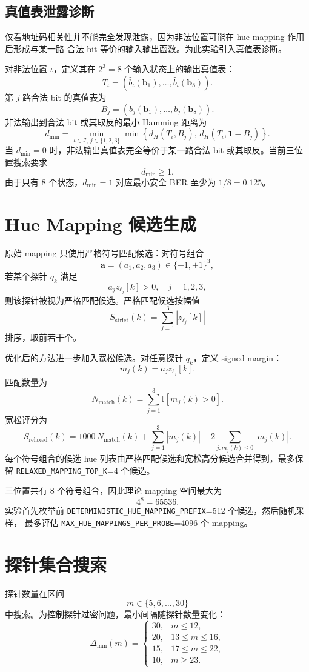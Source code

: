 \documentclass[UTF8,a4paper,11pt]{ctexart}
\begin{document}
\subsection{真值表泄露诊断}

仅看地址码相关性并不能完全发现泄露，因为非法位置可能在 hue mapping 作用后形成与某一路
合法 bit 等价的输入输出函数。为此实验引入真值表诊断。

对非法位置 $\iota$，定义其在 $2^3=8$ 个输入状态上的输出真值表：
\[
T_{\iota}=
\left(
\hat{b}_{\iota}(\mathbf{b}_1),\ldots,
\hat{b}_{\iota}(\mathbf{b}_8)
\right).
\]
第 $j$ 路合法 bit 的真值表为
\[
B_j=
\left(
b_j(\mathbf{b}_1),\ldots,b_j(\mathbf{b}_8)
\right).
\]
非法输出到合法 bit 或其取反的最小 Hamming 距离为
\[
d_{\min}
=
\min_{\iota\in\mathcal{I},\,j\in\{1,2,3\}}
\min\left\{
d_H(T_{\iota},B_j),\,
d_H(T_{\iota},\mathbf{1}-B_j)
\right\}.
\]
当 $d_{\min}=0$ 时，非法输出真值表完全等价于某一路合法 bit 或其取反。当前三位置搜索要求
\[
d_{\min}\geq 1.
\]
由于只有 8 个状态，$d_{\min}=1$ 对应最小安全 BER 至少为 $1/8=0.125$。

\section{Hue Mapping 候选生成}

原始 mapping 只使用严格符号匹配候选：对符号组合
\[
\mathbf{a}=(a_1,a_2,a_3)\in\{-1,+1\}^3,
\]
若某个探针 $q_k$ 满足
\[
a_j z_{\ell_j}[k] > 0,\quad j=1,2,3,
\]
则该探针被视为严格匹配候选。严格匹配候选按幅值
\[
S_{\mathrm{strict}}(k)=\sum_{j=1}^{3}|z_{\ell_j}[k]|
\]
排序，取前若干个。

优化后的方法进一步加入宽松候选。对任意探针 $q_k$，定义 signed margin：
\[
m_j(k)=a_j z_{\ell_j}[k].
\]
匹配数量为
\[
N_{\mathrm{match}}(k)=\sum_{j=1}^{3}\mathbb{I}[m_j(k)>0].
\]
宽松评分为
\[
S_{\mathrm{relaxed}}(k)
=1000\,N_{\mathrm{match}}(k)
+\sum_{j=1}^{3}|m_j(k)|
-2\sum_{j:m_j(k)\leq 0}|m_j(k)|.
\]
每个符号组合的候选 hue 列表由严格匹配候选和宽松高分候选合并得到，最多保留
\texttt{RELAXED\_MAPPING\_TOP\_K}=4 个候选。

三位置共有 8 个符号组合，因此理论 mapping 空间最大为
\[
4^8=65536.
\]
实验首先枚举前 \texttt{DETERMINISTIC\_HUE\_MAPPING\_PREFIX}=512 个候选，然后随机采样，
最多评估 \texttt{MAX\_HUE\_MAPPINGS\_PER\_PROBE}=4096 个 mapping。

\section{探针集合搜索}

探针数量在区间
\[
m\in\{5,6,\ldots,30\}
\]
中搜索。为控制探针过密问题，最小间隔随探针数量变化：
\[
\Delta_{\min}(m)=
\begin{cases}
30, & m\leq 12,\\
20, & 13\leq m\leq 16,\\
15, & 17\leq m\leq 22,\\
10, & m\geq 23.
\end{cases}
\]
\end{document}
